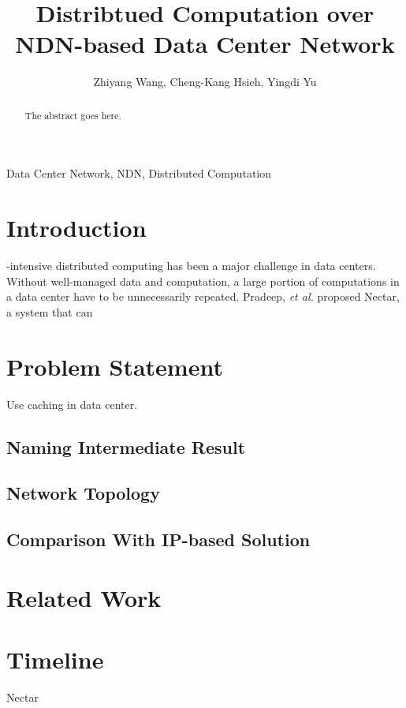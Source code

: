 \documentclass[journal]{IEEEtran}
\begin{document}
\title{Distribtued Computation over NDN-based Data Center Network}

\author{Zhiyang Wang,
        Cheng-Kang Hsieh,
        Yingdi Yu}

\maketitle

\begin{abstract}
The abstract goes here.
\end{abstract}

\begin{IEEEkeywords}
Data Center Network, NDN, Distributed Computation
\end{IEEEkeywords}

\IEEEpeerreviewmaketitle



\section{Introduction}
-intensive distributed computing has been a major
challenge in data centers.  Without well-managed data and computation, a large
portion of computations in a data center have to be unnecessarily repeated.
Pradeep, {\it et al.} proposed Nectar, a system that can  

\section{Problem Statement}
Use caching in data center.
\subsection{Naming Intermediate Result}
\subsection{Network Topology}
\subsection{Comparison With IP-based Solution}
\section{Related Work}
\section{Timeline}

\begin{thebibliography}{1}
Nectar
\end{thebibliography}
\end{document}
